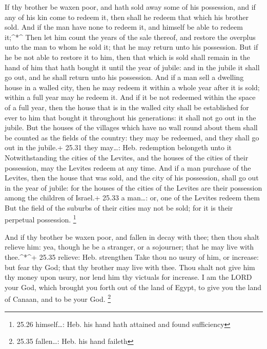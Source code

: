  If thy brother be waxen poor, and hath sold away some of
his possession, and if any of his kin come to redeem it, then shall he
redeem that which his brother sold.  And if the man have
none to redeem it, and himself be able to redeem it;\^{}*\^{}
 Then let him count the years of the sale thereof, and
restore the overplus unto the man to whom he sold it; that he may return
unto his possession.  But if he be not able to restore it
to him, then that which is sold shall remain in the hand of him that
hath bought it until the year of jubile: and in the jubile it shall go
out, and he shall return unto his possession.  And if a man
sell a dwelling house in a walled city, then he may redeem it within a
whole year after it is sold; within a full year may he redeem it.
 And if it be not redeemed within the space of a full year,
then the house that is in the walled city shall be established for ever
to him that bought it throughout his generations: it shall not go out in
the jubile.  But the houses of the villages which have no
wall round about them shall be counted as the fields of the country:
they may be redeemed, and they shall go out in the jubile.+ 25.31 they
may\ldots: Heb. redemption belongeth unto it 
Notwithstanding the cities of the Levites, and the houses of the cities
of their possession, may the Levites redeem at any time. 
And if a man purchase of the Levites, then the house that was sold, and
the city of his possession, shall go out in the year of jubile: for the
houses of the cities of the Levites are their possession among the
children of Israel.+ 25.33 a man\ldots: or, one of the Levites redeem
them  But the field of the suburbs of their cities may not
be sold; for it is their perpetual possession. \footnote{25.26
  himself\ldots: Heb. his hand hath attained and found sufficiency}

 And if thy brother be waxen poor, and fallen in decay with
thee; then thou shalt relieve him: yea, though he be a stranger, or a
sojourner; that he may live with thee.\^{}*\^{}+ 25.35 relieve: Heb.
strengthen  Take thou no usury of him, or increase: but
fear thy God; that thy brother may live with thee.  Thou
shalt not give him thy money upon usury, nor lend him thy victuals for
increase.  I am the LORD your God, which brought you forth
out of the land of Egypt, to give you the land of Canaan, and to be your
God. \footnote{25.35 fallen\ldots: Heb. his hand faileth}

